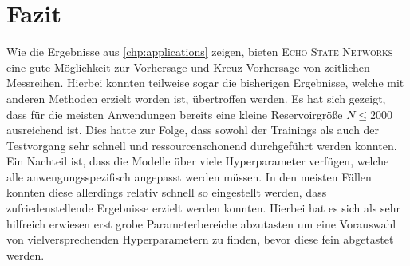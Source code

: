 \section{Fazit}
Wie die Ergebnisse aus \ref{chp:applications} zeigen, bieten \textsc{Echo State Networks} eine gute Möglichkeit zur Vorhersage und Kreuz-Vorhersage von zeitlichen Messreihen. Hierbei konnten teilweise sogar die bisherigen Ergebnisse, welche mit anderen Methoden erzielt worden ist, übertroffen werden. Es hat sich gezeigt, dass für die meisten Anwendungen bereits eine kleine Reservoirgröße $N \leq 2000$ ausreichend ist. Dies hatte zur Folge, dass sowohl der Trainings als auch der Testvorgang sehr schnell und ressourcenschonend durchgeführt werden konnten.\\

Ein Nachteil ist, dass die Modelle über viele Hyperparameter verfügen, welche alle anwengungsspezifisch angepasst werden müssen. In den meisten Fällen konnten diese allerdings relativ schnell so eingestellt werden, dass zufriedenstellende Ergebnisse erzielt werden konnten. Hierbei hat es sich als sehr hilfreich erwiesen erst grobe Parameterbereiche abzutasten um eine Vorauswahl von vielversprechenden Hyperparametern zu finden, bevor diese fein abgetastet werden. 
